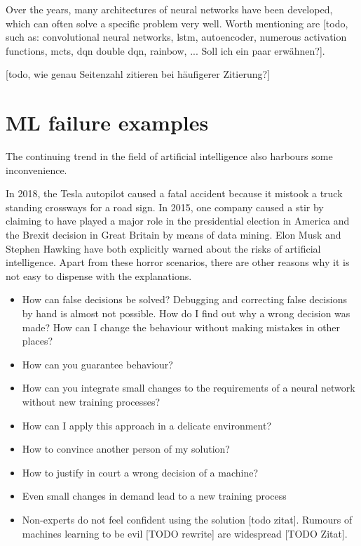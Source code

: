 Over the years, many architectures of neural networks have been developed, which can often solve a specific problem very well. Worth mentioning are [todo, such as: convolutional neural networks, lstm, autoencoder, numerous activation functions, mcts, dqn double dqn, rainbow, ... Soll ich ein paar erwähnen?]. \cite{AIINDEX2019} 

[todo, wie genau Seitenzahl zitieren bei häufigerer Zitierung?]

\section{ML failure examples}

The continuing trend in the field of artificial intelligence also harbours some inconvenience.

In 2018, the Tesla autopilot caused a fatal accident because it mistook a truck standing crossways for a road sign. In 2015, one company caused a stir by claiming to have played a major role in the presidential election in America and the Brexit decision in Great Britain by means of data mining. Elon Musk and Stephen Hawking have both explicitly warned about the risks of artificial intelligence.
Apart from these horror scenarios, there are other reasons why it is not easy to dispense with the explanations.

\begin{itemize}
    \item How can false decisions be solved? Debugging and correcting false decisions by hand is almost not possible. How do I find out why a wrong decision was made? How can I change the behaviour without making mistakes in other places?
    \item How can you guarantee behaviour?
    \item How can you integrate small changes to the requirements of a neural network without new training processes?
    \item How can I apply this approach in a delicate environment?
    \item How to convince another person of my solution?
    \item How to justify in court a wrong decision of a machine?
    \item Even small changes in demand lead to a new training process
    \item Non-experts do not feel confident using the solution [todo zitat]. Rumours of machines learning to be evil [TODO rewrite] are widespread [TODO Zitat].
\end{itemize}

